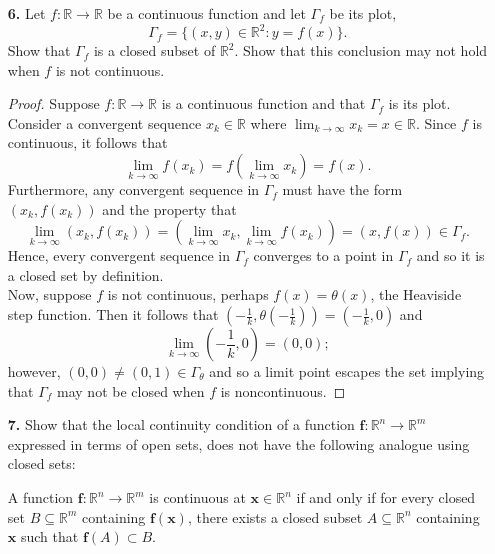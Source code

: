 \documentclass[ 12pt ]{article}
\begin{document}
\begin{enumerate}
	\item[\textbf{6.}] Let $f : \mathbb{R} \to \mathbb{R}$ be a continuous function and let $\Gamma_f$ be its plot, $$\Gamma_f = \{ (x, y) \in \mathbb{R}^2 : y = f(x) \}.$$ Show that
		$\Gamma_f$ is a closed subset of $\mathbb{R}^2$. Show that this conclusion may not hold when $f$ is not continuous.

		\begin{proof}
			Suppose $f : \mathbb{R} \to \mathbb{R}$ is a continuous function and that $\Gamma_f$ is its plot. Consider a convergent sequence $x_k \in \mathbb{R}$ where $\lim_{k \to
			\infty} x_k = x \in \mathbb{R}$. Since $f$ is continuous, it follows that $$\lim_{k \to \infty} f(x_k) = f \left ( \lim_{k \to \infty} x_k \right ) = f(x).$$ Furthermore,
			any convergent sequence in $\Gamma_f$ must have the form $(x_k, f(x_k))$ and the property that $$\lim_{k \to \infty} (x_k, f(x_k)) = \left ( \lim_{k \to \infty} x_k,
			\lim_{k \to \infty} f(x_k) \right ) = (x, f(x)) \in \Gamma_f.$$ Hence, every convergent sequence in $\Gamma_f$ converges to a point in $\Gamma_f$ and so it is a closed set
			by definition. \\

			Now, suppose $f$ is not continuous, perhaps $f(x) = \theta(x)$, the Heaviside step function. Then it follows that $\left ( -\frac{1}{k}, \theta \left ( -\frac{1}{k} \right )
			\right ) = \left ( -\frac{1}{k}, 0 \right )$ and $$\lim_{k \to \infty} \left ( -\frac{1}{k}, 0 \right ) = (0, 0);$$ however, $(0, 0) \neq (0, 1) \in 
			\Gamma_\theta$ and so a limit point escapes the set implying that $\Gamma_f$ may not be closed when $f$ is noncontinuous.
		\end{proof}


	\item[\textbf{7.}] Show that the local continuity condition of a function $\textbf{f} : \mathbb{R}^n \to \mathbb{R}^m$ expressed in terms of open sets, does not have the following
		analogue using closed sets:
		\begin{displayquote}
			A function $\textbf{f} : \mathbb{R}^n \to \mathbb{R}^m$ is continuous at $\textbf{x} \in \mathbb{R}^n$ if and only if for every closed set $B \subseteq \mathbb{R}^m$
			containing $\textbf{f}(\textbf{x})$, there exists a closed subset $A \subseteq \mathbb{R}^n$ containing $\textbf{x}$ such that $\textbf{f}(A) \subset B$.
		\end{displayquote}


\end{enumerate}
\end{document}
